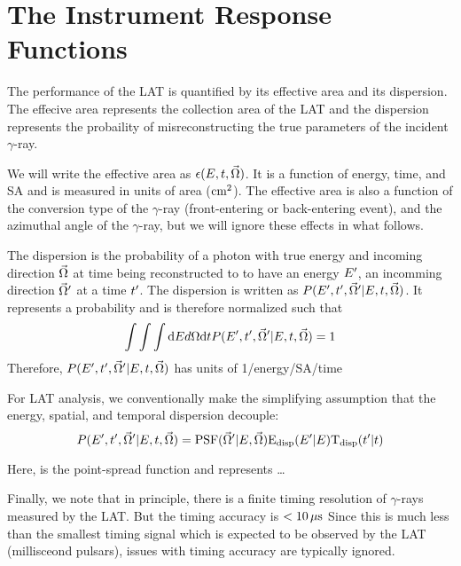 \section{The  Instrument Response Functions}


The performance of the LAT is quantified by its effective area
and its dispersion. The effecive area represents the collection area of the
\ac{LAT} and the dispersion represents the probaility of misreconstructing
the true parameters of the incident $\gamma$-ray.

We will write the
effective area as $\epsilon(E,t,\vec\Omega)$.  It is a
function of energy, time, and \ac{SA} and is measured in units of area
($\text{cm}^2$). The effective area is also a function of the conversion type
of the $\gamma$-ray (front-entering or back-entering event), and the azimuthal
angle of the $\gamma$-ray, but we will ignore these effects in what follows.

The dispersion is the probability of a photon with true energy
\energy and incoming direction $\vec\Omega$ at time \time being
reconstructed to to have an energy $E'$, an incomming direction
$\vec\Omega'$ at a time $t'$.  The dispersion is written as
$P(E',t',\vec\Omega'|E,t,\vec\Omega)$.
It represents a probability and is therefore normalized such that
\begin{equation}
  \int \int \int \text{d}E d\Omega \text{d}t 
  P(E',t',\vec\Omega'|E,t,\vec\Omega) = 1
\end{equation}
Therefore,
$P(E',t',\vec\Omega'|E,t,\vec\Omega)$
has units of 1/energy/\acl{SA}/time


For LAT analysis, we conventionally make the simplifying assumption that
the energy, spatial, and temporal dispersion decouple:
\begin{equation}
  P(E',t',\vec\Omega'|E,t,\vec\Omega) = 
  \text{PSF}(\vec\Omega'|E,\vec\Omega) \text{E}_\text{disp}(E'|E) \text{T}_\text{disp}(t'|t)
\end{equation}

Here, \psf is the point-spread function and represents \ldots
{}


Finally, we note that in principle, there is a finite timing
resolution of $\gamma$-rays measured by the \ac{LAT}. But
the timing accuracy is $<10\,\mu\text{s}$
\microsecond\cite{atwood_2009a_large-telescope} Since this is much
less than the smallest timing signal which is expected to be observed
by the \ac{LAT} (millisceond pulsars), issues with timing accuracy are
typically ignored.

